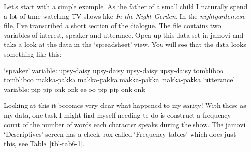 \documentclass[
  a4paper,
]{book}
\begin{document}
Let's start with a simple example. As the father of a small child I
naturally spend a lot of time watching TV shows like \emph{In the Night
Garden}. In the \emph{nightgarden.csv} file, I've transcribed a short
section of the dialogue. The file contains two variables of interest,
speaker and utterance. Open up this data set in jamovi and take a look
at the data in the `spreadsheet' view. You will see that the data looks
something like this:

`speaker' variable: upsy-daisy upsy-daisy upsy-daisy upsy-daisy
tombliboo tombliboo makka-pakka makka-pakka makka-pakka makka-pakka
`utterance' variable: pip pip onk onk ee oo pip pip onk onk

Looking at this it becomes very clear what happened to my sanity! With
these as my data, one task I might find myself needing to do is
construct a frequency count of the number of words each character speaks
during the show. The jamovi `Descriptives' screen has a check box called
`Frequency tables' which does just this, see Table~\ref{tbl-tab6-1}.

\hypertarget{tbl-tab6-1}{}
 
  \providecommand{\huxb}[2]{\arrayrulecolor[RGB]{#1}\global\arrayrulewidth=#2pt}
  \providecommand{\huxvb}[2]{\color[RGB]{#1}\vrule width #2pt}
  \providecommand{\huxtpad}[1]{\rule{0pt}{#1}}
  \providecommand{\huxbpad}[1]{\rule[-#1]{0pt}{#1}}
\end{document}
